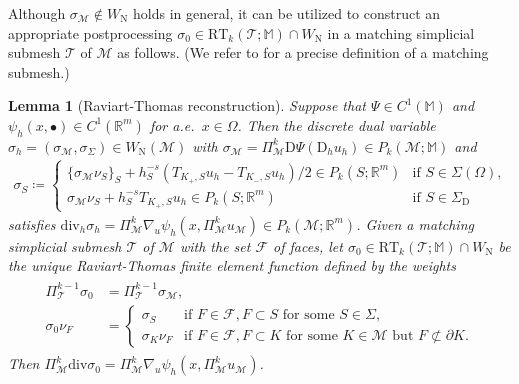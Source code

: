\documentclass[a4paper]{amsart}
\numberwithin{equation}{section}
\newcommand{\R}{\mathbb{R}}
\renewcommand{\div}{\mathrm{div}}
\newcommand{\Fcal}{\mathcal{F}}
\newcommand{\Tcal}{\mathcal{T}}
\newcommand{\Mcal}{\mathcal{M}}
\newcommand{\RT}{\mathrm{RT}}
\newcommand{\D}{\mathrm{D}}
\newcommand{\M}{\mathbb{M}}
\newtheorem{lemma}[theorem]{Lemma}
\theoremstyle{remark}
\begin{document}
Although $\sigma_\Mcal \notin W_\mathrm{N}$ holds in general, it can be utilized to construct an appropriate postprocessing $\sigma_0 \in \RT_k(\mathcal{T};\mathbb{M}) \cap W_\mathrm{N}$ in a matching simplicial submesh $\mathcal{T}$ of $\mathcal{M}$ as follows. (We refer to \cite[Definition 1.37]{DiPietroErn2012} for a precise definition of a matching submesh.)

\begin{lemma}[Raviart-Thomas reconstruction]\label{lem:discrete-dual-variable}
	Suppose that $\Psi \in C^1(\M)$ and $\psi_h(x,\bullet) \in C^1(\R^m)$ for a.e.~$x \in \Omega$. Then the discrete dual variable $\sigma_h = (\sigma_\Mcal, \sigma_\Sigma) \in W_\mathrm{N}(\Mcal)$ with $\sigma_\Mcal = \Pi_\Mcal^k \D \Psi(\D_h u_h) \in P_k(\Mcal;\M)$ and
	\begin{align*}
		\sigma_S \coloneqq \begin{cases}
			\{\sigma_\Mcal\nu_S\}_S + h_S^{-s} (T_{K_+,S} u_h - T_{K_-,S} u_h)/2 \in P_k(S;\R^m) &\mbox{if } S \in \Sigma(\Omega),\\
			\sigma_\Mcal\nu_S + h_S^{-s} T_{K_+,S} u_h \in P_k(S;\R^m) &\mbox{if } S \in \Sigma_\mathrm{D}
		\end{cases}
	\end{align*}
	satisfies $\div_h \sigma_h = \Pi_\Mcal^k \nabla_u \psi_h(x, \Pi_\Mcal^k u_\Mcal) \in P_k(\Mcal;\R^m)$.
	Given a matching simplicial submesh $\Tcal$ of $\Mcal$ with the set $\Fcal$ of faces, let $\sigma_0 \in \RT_k(\Tcal;\M) \cap W_\mathrm{N}$ be the unique Raviart-Thomas finite element function defined by the weights
	\begin{align}\label{def:sigma-RT}
		\begin{split}
			\Pi_\Tcal^{k-1} \sigma_0 &= \Pi_\Tcal^{k-1} \sigma_\Mcal,\\
			\sigma_0 \nu_F &= \begin{cases}
				\sigma_S &\mbox{if } F \in \Fcal, F \subset S \text{ for some } S \in \Sigma,\\
				\sigma_K \nu_F &\mbox{if } F\in \Fcal, F \subset K \text{ for some } K \in \mathcal{M} \text{ but } F \not\subset \partial K.
			\end{cases}
		\end{split}
	\end{align}
	Then $\Pi_\Mcal^k \div \sigma_0 = \Pi_\Mcal^k \nabla_u \psi_h(x,\Pi_\Mcal^k u_\Mcal)$.
\end{lemma}
\end{document}

